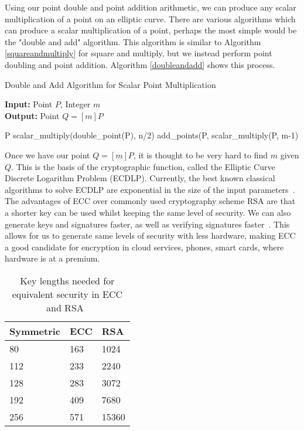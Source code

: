 Using our point double and point addition arithmetic, we can produce any scalar multiplication of a point on an elliptic curve. There are various algorithms which can produce a scalar multiplication of a point, perhaps the most simple would be the "double and add" algorithm. This algorithm is similar to Algorithm \ref{squareandmultiply} for square and multiply, but we instead perform point doubling and point addition. Algorithm \ref{doubleandadd} shows this process.
\begin{algorithm}[!htb]
\caption{Double and Add Algorithm for Scalar Point Multiplication}\label{doubleandadd}
\textbf{Input:} Point $P$, Integer $m$ \\
\textbf{Output:} Point $Q = [m]P$ 
\algrule
\begin{algorithmic}[1]
\Return P
\Return scalar\_multiply(double\_point(P), n/2)
\Return add\_points(P, scalar\_multiply(P, m-1)
\EndIf
\EndFunction
\end{algorithmic}
\end{algorithm}
Once we have our point $Q = [m]P$, it is thought to be very hard to find $m$ given $Q$. This is the basis of the cryptographic function, called the Elliptic Curve Discrete Logarithm Problem (ECDLP). Currently, the best known classical algorithms to solve ECDLP are exponential in the size of the input parameters~\cite{Galbraith2016}. 
The advantages of ECC over commonly used cryptography scheme RSA are that a shorter key can be used whilst keeping the same level of security. We can also generate keys and signatures faster, as well as verifying signatures faster~\cite{gura2004comparing}. This allows for us to generate same levels of security with less hardware, making ECC a good candidate for encryption in cloud services, phones, smart cards, where hardware is at a premium.
\begin{table}[!htb]
\centering
\begin{tabular}{|l|l|l|}
\hline
Symmetric & ECC & RSA \\ \hline
80 & 163 & 1024 \\ \hline
112 & 233 & 2240 \\ \hline
128 & 283 & 3072 \\ \hline
192 & 409 & 7680 \\ \hline
256 & 571 & 15360 \\ \hline
\end{tabular}
\caption{Key lengths needed for equivalent security in ECC and RSA~\cite{gura2004comparing}}
\end{table}
